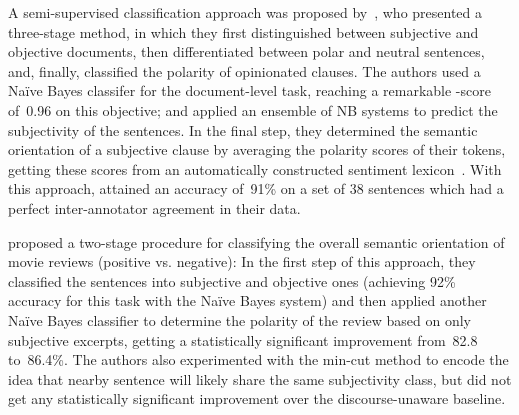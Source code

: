 
A semi-supervised classification approach was proposed
by~\citet{Yu:03}, who presented a three-stage method, in which they
first distinguished between subjective and objective documents, then
differentiated between polar and neutral sentences, and, finally,
classified the polarity of opinionated clauses.  The authors used a
Na{\"i}ve Bayes classifer for the document-level task, reaching a
remarkable \F-score of~0.96 on this objective; and applied an ensemble
of NB systems to predict the subjectivity of the sentences.  In the
final step, they determined the semantic orientation of a subjective
clause by averaging the polarity scores of their tokens, getting these
scores from an automatically constructed sentiment
lexicon~\cite{Hatzivassi:97}.  With this approach, \citeauthor{Yu:03}
attained an accuracy of~91\% on a set of 38 sentences which had a
perfect inter-annotator agreement in their data.




\citet{Pang:04} proposed a two-stage procedure for classifying the
overall semantic orientation of movie reviews (positive vs. negative):
In the first step of this approach, they classified the sentences into
subjective and objective ones (achieving 92\% accuracy for this task
with the Na\"ive Bayes system) and then applied another Na\"ive Bayes
classifier to determine the polarity of the review based on only
subjective excerpts, getting a statistically significant improvement
from~82.8 to~86.4\%.  The authors also experimented with the min-cut
method to encode the idea that nearby sentence will likely share the
same subjectivity class, but did not get any statistically significant
improvement over the discourse-unaware baseline.

